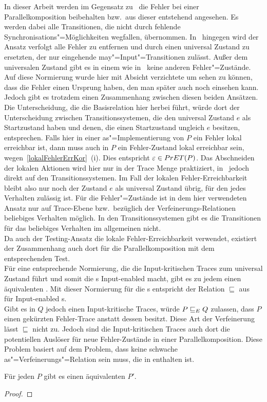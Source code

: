 In dieser Arbeit werden im Gegensatz zu~\cite{Vogler2016MIA3} die Fehler bei
einer Parallelkomposition beibehalten bzw.\ aus dieser entstehend angesehen. Es
werden dabei alle Transitionen, die nicht durch fehlende
Synchronisations"=Möglichkeiten wegfallen, übernommen. In~\cite{Vogler2016MIA3}
hingegen wird der Ansatz verfolgt alle Fehler zu entfernen und durch einen
universal Zustand zu ersetzten, der nur eingehende may"=Input"=Transitionen
zulässt. Außer dem universalen Zustand gibt es in einem \MIA wie
in~\cite{Vogler2016MIA3} keine anderen Fehler"=Zustände. Auf diese Normierung
wurde hier mit Absicht verzichtete um sehen zu können, dass die Fehler einen
Ursprung haben, den man später auch noch einsehen kann. Jedoch gibt es trotzdem
einen Zusammenhang zwischen diesen beiden Ansätzen.\\
Die Unterscheidung, die die Basisrelation \EBRel{} hier herbei führt, würde
dort der Unterscheidung zwischen Transitionssystemen, die den universal
Zustand $e$ als Startzustand haben und denen, die einen Startzustand ungleich
$e$ besitzen, entsprechen. Falls hier in einer as"=Implementierung von $P$ ein
Fehler lokal erreichbar ist, dann muss auch in $P$ ein Fehler-Zustand lokal
erreichbar sein, wegen~\ref{lokalFehlerErrKor}~(i). Dies entspricht
$\varepsilon \in PrET (P)$. Das Abschneiden der lokalen Aktionen wird hier nur
in der Trace Menge praktiziert, in~\cite{Vogler2016MIA3} jedoch direkt auf den
Transitionssystemen. Im Fall der lokalen Fehler-Erreichbarkeit bleibt also
nur noch der Zustand $e$ als universal Zustand übrig, für den jedes Verhalten
zulässig ist. Für die Fehler"=Zustände ist in dem hier verwendeten Ansatz nur
auf Trace-Ebene bzw.\ bezüglich der Verfeinerungs-Relationen beliebiges
Verhalten möglich. In den Transitionssystemen gibt es die Transitionen für das
beliebiges Verhalten im allgemeinen nicht.\\
Da auch der Testing-Ansatz die lokale Fehler-Erreichbarkeit verwendet,
existiert der Zusammenhang auch dort für die Parallelkomposition mit dem
entsprechenden Test.\\
Für eine entsprechende Normierung, die die Input-kritischen Traces zum
universal Zustand führt und somit die \MEIO{}s Input-enabled macht, gibt es zu
jedem \MEIO{} einen äquivalenten \MIA{}. Mit dieser Normierung für die \MEIO{}s
entspricht \ERel{} der Relation $\sqsubseteq$ aus~\cite{Vogler2016MIA3} für
Input-enabled \MIA{}s.\\
Gibt es in $Q$ jedoch einen Input-kritische Traces, würde $P  \sqsubseteq  _E Q$ zulassen,
dass $P$ einen gekürzten Fehler-Trace anstatt dessen besitzt. Diese Art der
Verfeinerung lässt $\sqsubseteq$ nicht zu. Jedoch sind die Input-kritischen
Traces auch dort die potentiellen Auslöser für neue Fehler-Zustände in einer
Parallelkomposition. Diese Problem basiert auf dem Problem, dass \ERel{} keine
schwache as"=Verfeinerungs"=Relation sein muss, die in \wasRel{} enthalten ist.

\begin{Def}
\end{Def}

\begin{Satz}
  Für jeden \MEIO{} $P$ gibt es einen äquivalenten \MIA{} $P'$.
\end{Satz}
\begin{proof}
\end{proof}
